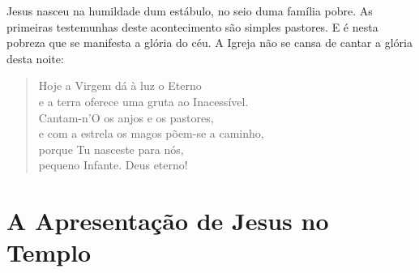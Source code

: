 \documentclass{rosario}
\begin{document}


Jesus nasceu na humildade dum estábulo, no seio duma família pobre.
As primeiras testemunhas deste acontecimento são simples pastores.
E é nesta pobreza que se manifesta a glória do céu.
A Igreja não se cansa de cantar a glória desta noite:

\begin{verse}
Hoje a Virgem dá à luz o Eterno \\
e a terra oferece uma gruta ao Inacessível. \\
Cantam-n'O os anjos e os pastores, \\
e com a estrela os magos põem-se a caminho, \\
porque Tu nasceste para nós, \\
pequeno Infante. Deus eterno!
\end{verse}


\section{A Apresentação de Jesus no Templo}



\end{document}
